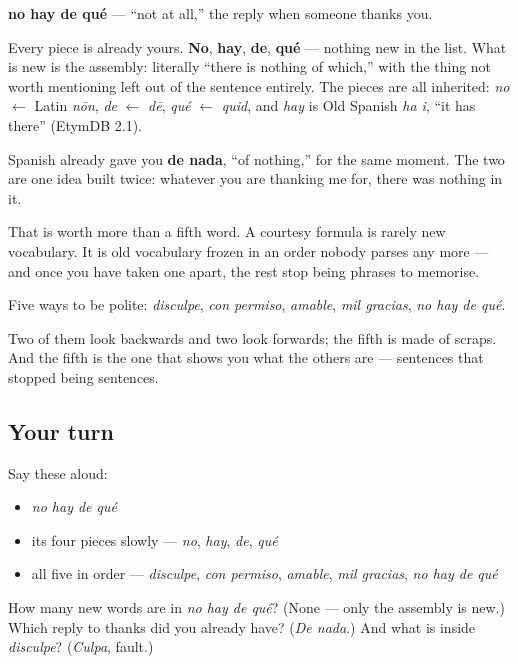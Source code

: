 \begin{cousinweb}
\textbf{no hay de qué} — \textquotedblleft{}not at all,\textquotedblright{} the reply when someone thanks you.

Every piece is already yours. \textbf{No}, \textbf{hay}, \textbf{de}, \textbf{qué} — nothing new in the list. What is new is the assembly: literally \textquotedblleft{}there is nothing of which,\textquotedblright{} with the thing not worth mentioning left out of the sentence entirely. The pieces are all inherited: \emph{no} $\leftarrow$ Latin \emph{nōn}, \emph{de} $\leftarrow$ \emph{dē}, \emph{qué} $\leftarrow$ \emph{quid}, and \emph{hay} is Old Spanish \emph{ha i}, \textquotedblleft{}it has there\textquotedblright{} (EtymDB 2.1).

Spanish already gave you \textbf{de nada}, \textquotedblleft{}of nothing,\textquotedblright{} for the same moment. The two are one idea built twice: whatever you are thanking me for, there was nothing in it.

That is worth more than a fifth word. A courtesy formula is rarely new vocabulary. It is old vocabulary frozen in an order nobody parses any more — and once you have taken one apart, the rest stop being phrases to memorise.
\end{cousinweb}

\begin{grammarlens}[title={What you've built}]
Five ways to be polite: \emph{disculpe}, \emph{con permiso}, \emph{amable}, \emph{mil gracias}, \emph{no hay de qué}.

Two of them look backwards and two look forwards; the fifth is made of scraps. And the fifth is the one that shows you what the others are — sentences that stopped being sentences.
\end{grammarlens}

\subsection*{Your turn}
Say these aloud:

\begin{itemize}
\raggedright
  \item \emph{no hay de qué}
  \item its four pieces slowly — \emph{no}, \emph{hay}, \emph{de}, \emph{qué}
  \item all five in order — \emph{disculpe}, \emph{con permiso}, \emph{amable}, \emph{mil gracias}, \emph{no hay de qué}
\end{itemize}

\begin{tcolorbox}[breakable,colback=teal!4,colframe=teal!35!black,title={Before you move on}]
How many new words are in \emph{no hay de qué}? (None — only the assembly is new.) Which reply to thanks did you already have? (\emph{De nada}.) And what is inside \emph{disculpe}? (\emph{Culpa}, fault.)
\end{tcolorbox}

